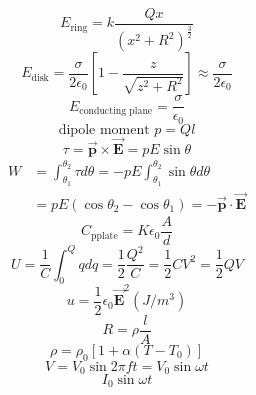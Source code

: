 \documentclass[12pt,landscape]{article}
\begin{document}
\begin{multicols}{4}
\begin{equation*}
    \end{equation*}
    \begin{equation*}
        E_{\text{ring}} = k \frac{Qx}{(x^2+R^2)^\frac{3}{2}}
    \end{equation*}
    \begin{equation*}
        E_{\text{disk}} = \frac{\sigma}{2\epsilon_0} \left[1 - \frac{z}{\sqrt{z^2 + R^2}}\right] \approx \frac{\sigma}{2\epsilon_0}
    \end{equation*}
    \begin{equation*}
        E_{\text{conducting plane}} = \frac{\sigma}{\epsilon_0}
    \end{equation*}
    \begin{equation*}
        \text{dipole moment } p = Ql
    \end{equation*}
    \begin{equation*}
        \tau = \vec{\mathbf{p}} \times \vec{\mathbf{E}} = p E \sin{\theta}
    \end{equation*}
    \begin{align*}
        W & = \int_{\theta_1}^{\theta_2} \tau d\theta = -pE \int_{\theta_1}^{\theta_2} \sin{\theta} d\theta \\
          & = p E (\cos{\theta_2} - \cos{\theta_1}) = -\vec{\mathbf{p}} \cdot \vec{\mathbf{E}}
    \end{align*}
    \begin{equation*}
        C_{\text{pplate}} = K \epsilon_0 \frac{A}{d}
    \end{equation*}
    \begin{equation*}
        U = \frac{1}{C} \int_{0}^{Q} q dq = \frac{1}{2}\frac{Q^2}{C} = \frac{1}{2} CV^2 = \frac{1}{2}QV
    \end{equation*}
    \begin{equation*}
        u = \frac{1}{2} \epsilon_0 \vec{\mathbf{E}}^2 (J / m^3)
    \end{equation*}
    \begin{equation*}
        R = \rho \frac{l}{A}
    \end{equation*}
    \begin{equation*}
        \rho = \rho_0 [1 + \alpha(T - T_0)]
    \end{equation*}
    \begin{equation*}
        V = V_0 \sin{2\pi f} t = V_0 \sin{\omega t}
    \end{equation*}
    \begin{equation*}
        I_0 \sin{\omega t}
    \end{equation*}

\end{multicols}
\end{document}

